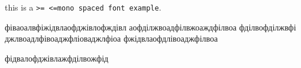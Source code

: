 \documentclass[a4paper,14pt]{extarticle}
\begin{document}
this is a \texttt{>= <=mono spaced font example}.


фіваоалвфіжідвлаофджівлофждівл аофділжвоадфілвжоаждфілвоа фділвофділжвфі джлвоадлфівоаджфліоваджлфіоа
фжідвлаофдлівоаджфілвоа


фідвалофджівлажфділвожфід
\end{document}
